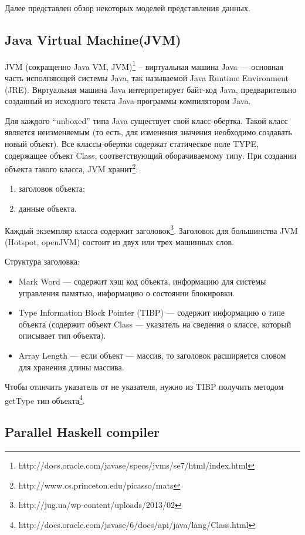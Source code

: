 Далее представлен обзор некоторых моделей представления данных.

\subsection {Java Virtual Machine(JVM)}
JVM (сокращенно Java VM, JVM)\footnote{http://docs.oracle.com/javase/specs/jvms/se7/html/index.html} --
виртуальная машина Java --- основная часть исполняющей системы Java,
так называемой Java Runtime Environment (JRE).
Виртуальная машина Java интерпретирует байт-код Java,
предварительно созданный из исходного текста Java-программы
компилятором Java.

Для каждого ``unboxed'' типа Java существует свой класс-обертка.
Такой класс является неизменяемым (то есть, для изменения значения необходимо создавать новый объект).
Все классы-обертки содержат статическое поле TYPE, содержащее объект Class, соответствующий оборачиваемому типу.
При создании объекта такого класса, JVM хранит\footnote{http://www.cs.princeton.edu/picasso/mats}:

\begin{enumerate}
\item заголовок объекта;
\item данные объекта.
\end{enumerate}

Каждый экземпляр класса содержит заголовок\footnote{http://jug.ua/wp-content/uploads/2013/02}. Заголовок для 
большинства JVM (Hotspot, openJVM) состоит из двух или трех машинных слов.

Структура заголовка:

\begin{itemize}
\item Mark Word --- содержит хэш код объекта, информацию для системы управления памятью, информацию о состоянии блокировки. 
\item Type Information Block Pointer (TIBP) --- содержит информацию о типе объекта (содержит объект Class --- указатель на сведения о классе, который описывает тип объекта).
\item Array Length --- если объект --- массив, то заголовок расширяется словом для хранения длины массива.
\end{itemize}            

Чтобы отличить указатель от не указателя, нужно из TIBP получить методом getType тип объекта\footnote{http://docs.oracle.com/javase/6/docs/api/java/lang/Class.html}.

\subsection {Parallel Haskell compiler}

